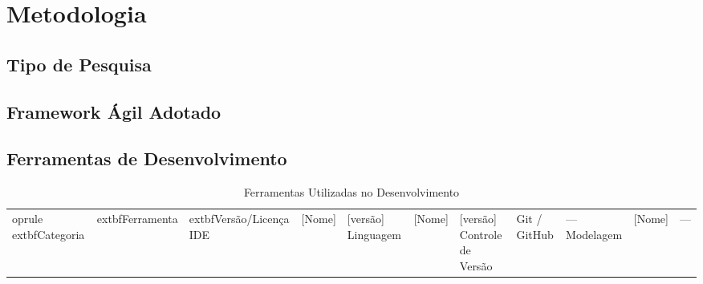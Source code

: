 \section{Metodologia}
\label{sec:metodologia}

\subsection{Tipo de Pesquisa}

\subsection{Framework Ágil Adotado}

\subsection{Ferramentas de Desenvolvimento}
\begin{table}[h]
\caption{Ferramentas Utilizadas no Desenvolvimento}
\label{tab:ferramentas}
\centering
\begin{tabular}{lll}
	oprule
	extbf{Categoria} & 	extbf{Ferramenta} & 	extbf{Versão/Licença} 
\midrule
IDE                & [Nome]              & [versão]               
Linguagem          & [Nome]              & [versão]               
Controle de Versão & Git / GitHub        & —                      
Modelagem          & [Nome]              & —                      
\bottomrule
\end{tabular}
\end{table}

